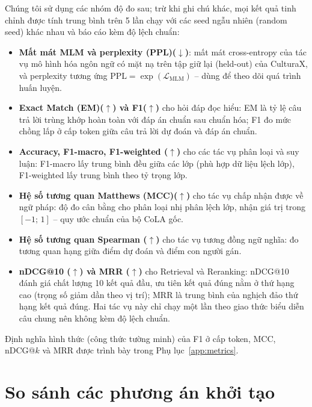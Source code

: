 Chúng tôi sử dụng các nhóm độ đo sau; trừ khi ghi chú khác, mọi kết quả tinh chỉnh được
tính trung bình trên 5 lần chạy với các seed ngẫu nhiên (random seed) khác nhau và báo cáo kèm độ lệch chuẩn:

\begin{itemize}
  \item \textbf{Mất mát MLM và perplexity (PPL)($\downarrow$)}: mất mát cross-entropy của
        tác vụ mô hình hóa ngôn ngữ có mặt nạ trên tập giữ lại (held-out) của CulturaX, và
        perplexity tương ứng $\mathrm{PPL} = \exp(\mathcal{L}_{\mathrm{MLM}})$ -- dùng để
        theo dõi quá trình huấn luyện.
  \item \textbf{Exact Match (EM)($\uparrow$) và F1($\uparrow$)} cho hỏi đáp đọc hiểu: EM
        là tỷ lệ câu trả lời trùng khớp hoàn toàn với đáp án chuẩn sau chuẩn hóa; F1 đo
        mức chồng lấp ở cấp token giữa câu trả lời dự đoán và đáp án chuẩn.
  \item \textbf{Accuracy, F1-macro, F1-weighted ($\uparrow$)} cho các tác vụ phân loại và
        suy luận: F1-macro lấy trung bình đều giữa các lớp (phù hợp dữ liệu lệch lớp),
        F1-weighted lấy trung bình theo tỷ trọng lớp.
  \item \textbf{Hệ số tương quan Matthews (MCC)($\uparrow$)} cho tác vụ chấp nhận được về
        ngữ pháp: độ đo cân bằng cho phân loại nhị phân lệch lớp, nhận giá trị trong
        $[-1;\,1]$ -- quy ước chuẩn của bộ CoLA gốc.
  \item \textbf{Hệ số tương quan Spearman ($\uparrow$)} cho tác vụ tương đồng ngữ nghĩa:
        đo tương quan hạng giữa điểm dự đoán và điểm con người gán.
  \item \textbf{nDCG@10 ($\uparrow$) và MRR ($\uparrow$)} cho Retrieval và Reranking:
        nDCG@10 đánh giá chất lượng 10 kết quả đầu, ưu tiên kết quả đúng nằm ở thứ hạng cao
        (trọng số giảm dần theo vị trí); MRR là trung bình của nghịch đảo thứ hạng kết quả đúng.
        Hai tác vụ này chỉ chạy một lần theo giao thức biểu diễn câu chung nên không kèm độ lệch chuẩn.
\end{itemize}

Định nghĩa hình thức (công thức tường minh) của F1 ở cấp token, MCC, nDCG@$k$ và MRR được
trình bày trong Phụ lục~\ref{app:metrics}.

\section{So sánh các phương án khởi tạo}
\label{sec:exp-bakeoff}

